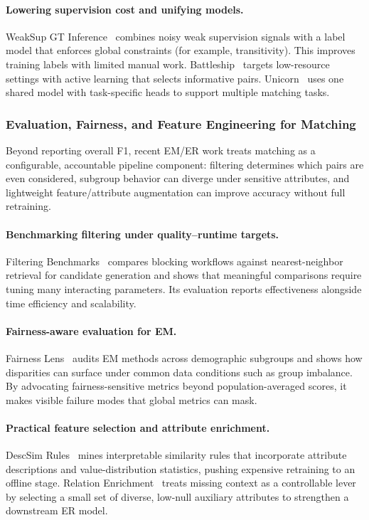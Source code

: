 \documentclass[sigconf,nonacm]{acmart}
\begin{document}
\paragraph{Lowering supervision cost and unifying models.}
WeakSup GT Inference~\cite{10.1145/3588712} combines noisy weak supervision signals with a label model that enforces global constraints (for example, transitivity). This improves training labels with limited manual work. Battleship~\cite{10.1145/3626711} targets low-resource settings with active learning that selects informative pairs. Unicorn~\cite{10.1145/3588938} uses one shared model with task-specific heads to support multiple matching tasks.


\subsubsection{Evaluation, Fairness, and Feature Engineering for Matching}

Beyond reporting overall F1, recent EM/ER work treats matching as a configurable, accountable pipeline component: filtering determines which pairs are even considered, subgroup behavior can diverge under sensitive attributes, and lightweight feature/attribute augmentation can improve accuracy without full retraining.

\paragraph{Benchmarking filtering under quality--runtime targets.}
Filtering Benchmarks~\cite{10184692} compares blocking workflows against nearest-neighbor retrieval for candidate generation and shows that meaningful comparisons require tuning many interacting parameters. Its evaluation reports effectiveness alongside time efficiency and scalability.

\paragraph{Fairness-aware evaluation for EM.}
Fairness Lens~\cite{10.14778/3611479.3611525} audits EM methods across demographic subgroups and shows how disparities can surface under common data conditions such as group imbalance. By advocating fairness-sensitive metrics beyond population-averaged scores, it makes visible failure modes that global metrics can mask.

\paragraph{Practical feature selection and attribute enrichment.}
DescSim Rules~\cite{11112979} mines interpretable similarity rules that incorporate attribute descriptions and value-distribution statistics, pushing expensive retraining to an offline stage. Relation Enrichment~\cite{10.14778/3681954.3681987} treats missing context as a controllable lever by selecting a small set of diverse, low-null auxiliary attributes to strengthen a downstream ER model.
\end{document}
